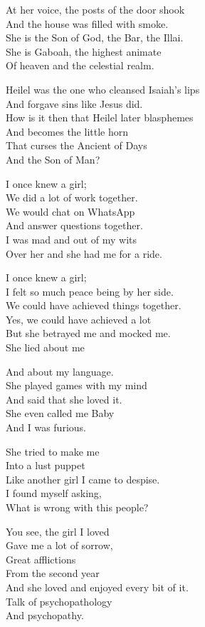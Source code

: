 \documentclass[
]{book}
\begin{document}
At her voice, the posts of the door shook\\
And the house was filled with smoke.\\
She is the Son of God, the Bar, the Illai.\\
She is Gaboah, the highest animate\\
Of heaven and the celestial realm.

Heilel was the one who cleansed Isaiah's lips\\
And forgave sins like Jesus did.\\
How is it then that Heilel later blasphemes\\
And becomes the little horn\\
That curses the Ancient of Days\\
And the Son of Man?

I once knew a girl;\\
We did a lot of work together.\\
We would chat on WhatsApp\\
And answer questions together.\\
I was mad and out of my wits\\
Over her and she had me for a ride.

I once knew a girl;\\
I felt so much peace being by her side.\\
We could have achieved things together.\\
Yes, we could have achieved a lot\\
But she betrayed me and mocked me.\\
She lied about me

And about my language.\\
She played games with my mind\\
And said that she loved it.\\
She even called me Baby\\
And I was furious.

She tried to make me\\
Into a lust puppet\\
Like another girl I came to despise.\\
I found myself asking,\\
What is wrong with this people?

You see, the girl I loved\\
Gave me a lot of sorrow,\\
Great afflictions\\
From the second year\\
And she loved and enjoyed every bit of it.\\
Talk of psychopathology\\
And psychopathy.
\end{document}
